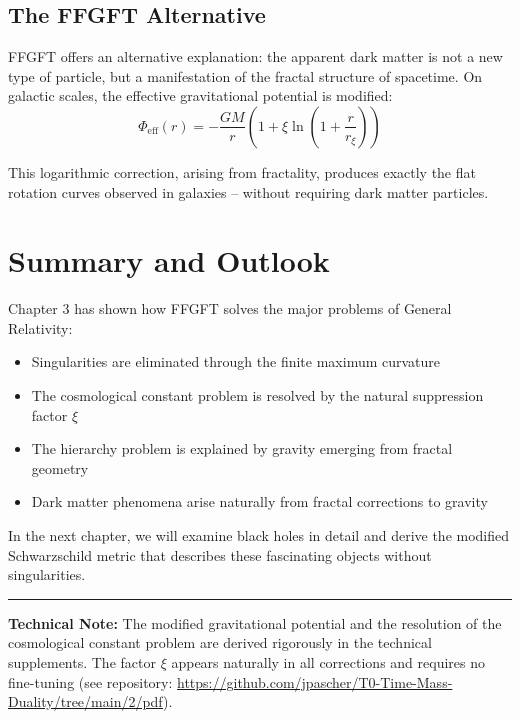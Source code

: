 \subsection{The FFGFT Alternative}

FFGFT offers an alternative explanation: the apparent dark matter is not a new type of particle, but a manifestation of the fractal structure of spacetime. On galactic scales, the effective gravitational potential is modified:
\begin{equation}
\Phi_{\text{eff}}(r) = -\frac{GM}{r} \left( 1 + \xi \ln\left(1 + \frac{r}{r_\xi}\right) \right)
\end{equation}

This logarithmic correction, arising from fractality, produces exactly the flat rotation curves observed in galaxies -- without requiring dark matter particles.

\section{Summary and Outlook}

Chapter 3 has shown how FFGFT solves the major problems of General Relativity:

\begin{itemize}[leftmargin=*]
\item Singularities are eliminated through the finite maximum curvature
\item The cosmological constant problem is resolved by the natural suppression factor $\xi$
\item The hierarchy problem is explained by gravity emerging from fractal geometry
\item Dark matter phenomena arise naturally from fractal corrections to gravity
\end{itemize}

In the next chapter, we will examine black holes in detail and derive the modified Schwarzschild metric that describes these fascinating objects without singularities.

\vspace{1cm}
\hrule
\vspace{0.5cm}
\noindent\textbf{Technical Note:} The modified gravitational potential and the resolution of the cosmological constant problem are derived rigorously in the technical supplements. The factor $\xi$ appears naturally in all corrections and requires no fine-tuning (see repository: \url{https://github.com/jpascher/T0-Time-Mass-Duality/tree/main/2/pdf}).



